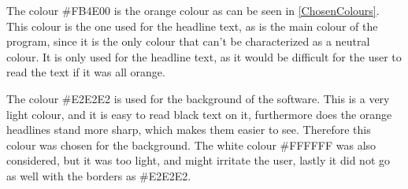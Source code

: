 The colour \#FB4E00 is the orange colour as can be seen in \cref{ChosenColours}. This colour is the one used for the headline text, as is the main colour of the program, since it is the only colour that can't be characterized as a neutral colour. It is only used for the headline text, as it would be difficult for the user to read the text if it was all orange.

The colour \#E2E2E2 is used for the background of the software. This is a very light colour, and it is easy to read black text on it, furthermore does the orange headlines stand more sharp, which makes them easier to see. Therefore this colour was chosen for the background. The white colour \#FFFFFF was also considered, but it was too light, and might irritate the user, lastly it did not go as well with the borders as \#E2E2E2.

